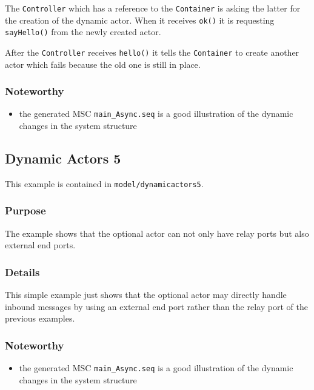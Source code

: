 The \texttt{Controller} which has a reference to the \texttt{Container} is asking the latter
for the creation of the dynamic actor. When it receives \texttt{ok()} it is requesting \texttt{sayHello()}
from the newly created actor.

After the \texttt{Controller} receives \texttt{hello()} it tells the \texttt{Container} to create another
actor which fails because the old one is still in place.

\subsubsection{Noteworthy}

\begin{itemize}
\item the generated MSC \texttt{main\_Async.seq} is a good illustration of the dynamic changes in the system structure
\end{itemize}

\subsection{Dynamic Actors 5}

This example is contained in \texttt{model/dynamicactors5}.

\subsubsection{Purpose}

The example shows that the optional actor can not only have relay ports but also external end ports.

\subsubsection{Details}

This simple example just shows that the optional actor may directly handle inbound messages by using an
external end port rather than the relay port of the previous examples.

\subsubsection{Noteworthy}

\begin{itemize}
\item the generated MSC \texttt{main\_Async.seq} is a good illustration of the dynamic changes in the system structure
\end{itemize}


